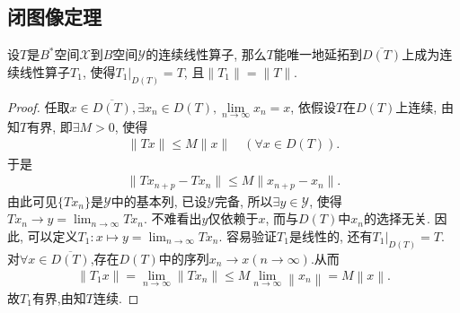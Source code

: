 \documentclass[../../main.tex]{subfiles}%
\begin{document}
\subsection{闭图像定理}

\begin{theorem}
设$T$是$B^*$空间$\mathscr{X}$到$B$空间$\mathscr{Y}$的连续线性算子, 那么$T$能唯一地延拓到$\overline{D(T)}$上成为连续线性算子$T_1$, 使得$T_1|_{D(T)}=T$, 且$\|T_1\|=\|T\|$.
\end{theorem}
\begin{proof}
任取$x\in\overline{D(T)},\exists x_n\in D(T),\lim\limits_{n\to\infty}x_n=x$, 依假设$T$在$D(T)$上连续, 由知$T$有界, 即$\exists M>0$, 使得
\begin{align*}
\|Tx\|\leqslant M\|x\|\quad(\forall x\in D(T)).
\end{align*}
于是
\begin{align*}
\|Tx_{n+p}-Tx_n\|\leqslant M\|x_{n+p}-x_n\|.
\end{align*}
由此可见$\{Tx_n\}$是$\mathscr{Y}$中的基本列, 已设$\mathscr{Y}$完备, 所以$\exists y\in\mathscr{Y}$, 使得$Tx_n\to y=\lim_{n\to \infty}Tx_n$. 不难看出$y$仅依赖于$x$, 而与$D(T)$中$x_n$的选择无关. 因此, 可以定义$T_1:x\mapsto y= \lim_{n\to \infty}Tx_n$. 容易验证$T_1$是线性的, 还有$T_1|_{D(T)}=T$. 对$\forall x\in\overline{D(T)}$,存在$D(T)$中的序列$x_n\rightarrow x\left( n\rightarrow \infty \right)$.从而
\begin{align*}
\left\| T_1x \right\| =\underset{n\rightarrow \infty}{\lim}\left\| Tx_n \right\| \leqslant M\underset{n\rightarrow \infty}{\lim}\left\| x_n \right\| =M\left\| x \right\| .
\end{align*}
故$T_1$有界,由知$T$连续.
\end{proof}
\end{document}
